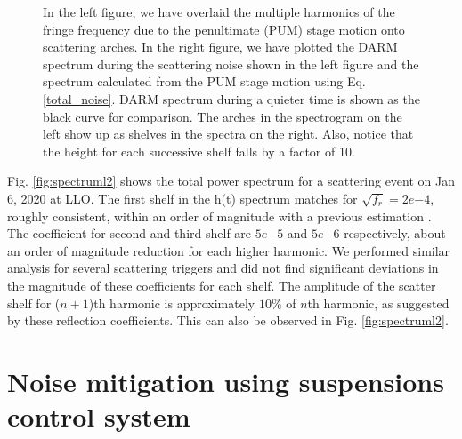 \documentclass[12pt]{iopart}
\begin{document}
\begin{figure}[h]
\begin{subfigure}[b]{0.44\textwidth}
    
    \end{subfigure}
    \caption{In the left figure, we have overlaid the multiple harmonics of the fringe frequency due to the penultimate (PUM) stage motion onto scattering arches. In the right figure, we have plotted the DARM spectrum during the scattering noise shown in the left figure and the spectrum calculated from the PUM stage motion using Eq. \ref{total_noise}. DARM spectrum during a quieter time is shown as the black curve for comparison. The arches in the spectrogram on the left show up as shelves in the spectra on the right. Also, notice that the height for each successive shelf falls by a factor of 10. }
    \label{fig:fringespectrum}
    
\end{figure}


Fig. \ref{fig:spectruml2} shows the total power spectrum for a scattering event on Jan 6, 2020 at LLO. The first shelf in the h(t) spectrum matches for $\sqrt{f_{r}} = 2e{-4}$, roughly consistent, within an order of magnitude with a previous estimation \cite{hiro_calc}. The coefficient for second and third shelf are $5e{-5}$ and $5e{-6}$ respectively, about an order of magnitude reduction for each higher harmonic. We performed similar analysis for several scattering triggers and did not find significant deviations in the magnitude of these coefficients for each shelf. The amplitude of the scatter shelf for ($n+1$)th harmonic is approximately $10 \%$ of $n$th harmonic, as suggested by these reflection coefficients. This can also be observed in Fig. \ref{fig:spectruml2}. 
\qquad



\section{Noise mitigation using suspensions control system} \label{rzero}
\end{document}

